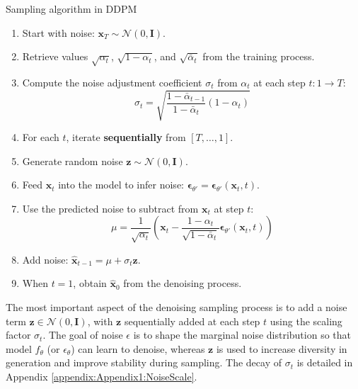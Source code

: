 \begin{algorithm}[h]
	\caption{Sampling algorithm in DDPM}
	\label{alg:samplingddpm}
	\setlength{\baselineskip}{10pt}
	\begin{enumerate}
		\item Start with noise: $\mathbf{x}_T \sim \mathcal{N}(0, \mathbf{I})$.
		
		\item Retrieve values $\sqrt{\alpha_t}$, $\sqrt{1 - \alpha_t}$, and $\sqrt{\bar{\alpha}_t}$ from the training process.
		
		\item Compute the noise adjustment coefficient $\sigma_t$ from $\alpha_t$ at each step $t: 1 \rightarrow T$:
		\[
		\sigma_t = \sqrt{\frac{1 - \bar{\alpha}_{t-1}}{1 - \bar{\alpha}_t} (1 - \alpha_t)}
		\]
		
		\item For each $t$, iterate \textbf{sequentially} from $[T, \dots, 1]$.
		
		\item Generate random noise $\mathbf{z} \sim \mathcal{N}(0, \mathbf{I})$.
		
		\item Feed $\mathbf{x}_t$ into the model to infer noise: $\boldsymbol{\epsilon}_{\theta'} = \boldsymbol{\epsilon}_{\theta'}(\mathbf{x}_t, t)$.
		
		\item Use the predicted noise to subtract from $\mathbf{x}_t$ at step $t$:
		\[
		\mu = \frac{1}{\sqrt{\alpha_t}} \left( \mathbf{x}_t - \frac{1 - \alpha_t}{\sqrt{1 - \bar{\alpha}_t}} \boldsymbol{\epsilon}_{\theta'}(\mathbf{x}_t, t) \right)
		\]
		
		\item Add noise: $\hat{\mathbf{x}}_{t-1} = \mu + \sigma_t \mathbf{z}$.
		
		\item When $t = 1$, obtain $\hat{\mathbf{x}}_0$ from the denoising process.
	\end{enumerate}
\end{algorithm}

The most important aspect of the denoising sampling process is to add a noise term $\mathbf{z} \in \mathcal{N}(0, \mathbf{I})$, with $\mathbf{z}$ sequentially added at each step $t$ using the scaling factor $\sigma_t$. The goal of noise $\epsilon$ is to shape the marginal noise distribution so that model $f_\theta$ (or $\epsilon_{\theta}$) can learn to denoise, whereas $\mathbf{z}$ is used to increase diversity in generation and improve stability during sampling. The decay of $\sigma_t$ is detailed in Appendix \autoref{appendix:Appendix1:NoiseScale}.

